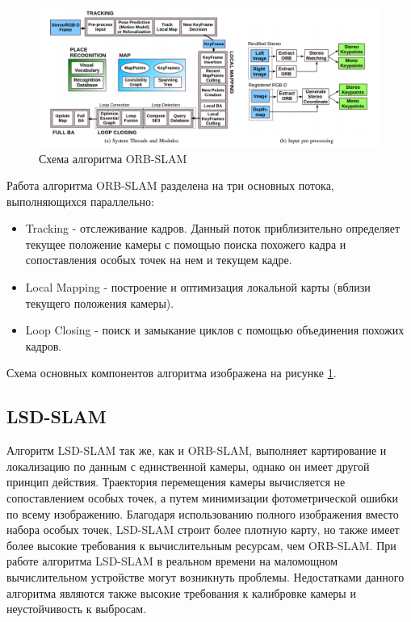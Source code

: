 \documentclass{mipt-thesis-ms}
\begin{document}
	\begin{figure}
		\includegraphics[width=1.0\textwidth]{img/orb_slam_scheme_high_resolution.png}
		\caption{Схема алгоритма ORB-SLAM}
		\label{figure_orb_slam}
	\end{figure}
	
	Работа алгоритма ORB-SLAM разделена на три основных потока, выполняющихся параллельно:
	
	\begin{itemize}
		\item Tracking - отслеживание кадров. Данный поток приблизительно определяет текущее положение камеры с помощью поиска похожего кадра и сопоставления особых точек на нем и текущем кадре.
		\item Local Mapping - построение и оптимизация локальной карты (вблизи текущего положения камеры).
		\item Loop Closing - поиск и замыкание циклов с помощью объединения похожих кадров.
	\end{itemize}

	Схема основных компонентов алгоритма изображена на рисунке \ref{figure_orb_slam}.
	
	\subsection{LSD-SLAM}
	
	Алгоритм LSD-SLAM \cite{engel2014lsd} так же, как и ORB-SLAM, выполняет картирование и локализацию по данным с единственной камеры, однако он имеет другой принцип действия. Траектория перемещения камеры вычисляется не сопоставлением особых точек, а путем минимизации фотометрической ошибки по всему изображению. Благодаря использованию полного изображения вместо набора особых точек, LSD-SLAM строит более плотную карту, но также имеет более высокие требования к вычислительным ресурсам, чем ORB-SLAM. При работе алгоритма LSD-SLAM в реальном времени на маломощном вычислительном устройстве могут возникнуть проблемы. Недостатками данного алгоритма являются также высокие требования к калибровке камеры и неустойчивость к выбросам.
	
\end{document}
